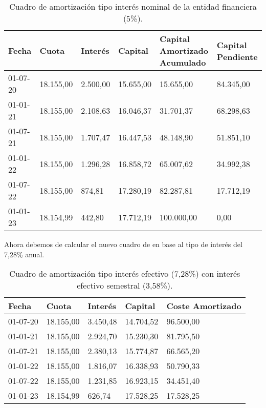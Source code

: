 \begin{table}[H]
    \centering
    \begin{tabular}{|p{2cm}|p{2cm}|p{2cm}|p{2cm}|p{2cm}|p{2cm}|}
    \hline
    \rowcolor{blue!30}
    \textbf{Fecha} & \textbf{Cuota} & \textbf{Interés} & \textbf{Capital} & \textbf{Capital Amortizado Acumulado} & \textbf{Capital Pendiente} \\
    \hline
    01-07-20 & 18.155,00 & 2.500,00 & 15.655,00 & 15.655,00 & 84.345,00 \\
    \hline
    01-01-21 & 18.155,00 & 2.108,63 & 16.046,37 & 31.701,37 & 68.298,63 \\
    \hline
    01-07-21 & 18.155,00 & 1.707,47 & 16.447,53 & 48.148,90 & 51.851,10 \\
    \hline
    01-01-22 & 18.155,00 & 1.296,28 & 16.858,72 & 65.007,62 & 34.992,38 \\
    \hline
    01-07-22 & 18.155,00 & 874,81 & 17.280,19 & 82.287,81 & 17.712,19 \\
    \hline
    01-01-23 & 18.154,99 & 442,80 & 17.712,19 & 100.000,00 & 0,00 \\
    \hline
    \end{tabular}
    \caption{Cuadro de amortización tipo interés nominal de la entidad financiera (5\%).}
    \label{tabla:Asiento1-Ejercicio7-tema2}
\end{table}

Ahora debemos de calcular el nuevo cuadro de en base al tipo de interés del 7,28\% anual.

\begin{table}[H]
    \centering
    \begin{tabular}{|p{2cm}|p{2cm}|p{2cm}|p{2cm}|p{2cm}|}
    \hline
    \rowcolor{blue!30}
    \textbf{Fecha} & \textbf{Cuota} & \textbf{Interés} & \textbf{Capital} & \textbf{Coste Amortizado} \\
    \hline
    01-07-20 & 18.155,00 & 3.450,48 & 14.704,52 & 96.500,00 \\
    \hline
    01-01-21 & 18.155,00 & 2.924,70 & 15.230,30 & 81.795,50 \\
    \hline
    01-07-21 & 18.155,00 & 2.380,13 & 15.774,87 & 66.565,20 \\
    \hline
    01-01-22 & 18.155,00 & 1.816,07 & 16.338,93 & 50.790,33 \\
    \hline
    01-07-22 & 18.155,00 & 1.231,85 & 16.923,15 & 34.451,40 \\
    \hline
    01-01-23 & 18.154,99 & 626,74 & 17.528,25 & 17.528,25 \\
    \hline
    \end{tabular}
    \caption{Cuadro de amortización tipo interés efectivo (7,28\%) con interés efectivo semestral (3,58\%).}
    \label{tabla:amortizacion_efectivo}
\end{table}

